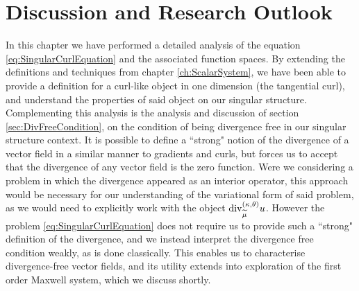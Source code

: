 \section{Discussion and Research Outlook} \label{sec:CC-Discussion}
In this chapter we have performed a detailed analysis of the equation \eqref{eq:SingularCurlEquation} and the associated function spaces.
By extending the definitions and techniques from chapter \ref{ch:ScalarSystem}, we have been able to provide a definition for a curl-like object in one dimension (the tangential curl), and understand the properties of said object on our singular structure.
Complementing this analysis is the analysis and discussion of section \ref{sec:DivFreeCondition}, on the condition of being divergence free in our singular structure context.
It is possible to define a ``strong" notion of the divergence of a vector field in a similar manner to gradients and curls, but forces us to accept that the divergence of any vector field is the zero function.
Were we considering a problem in which the divergence appeared as an interior operator, this approach would be necessary for our understanding of the variational form of said problem, as we would need to explicitly work with the object $\mathrm{div}_{\widetilde{\mu}}^{\left( \kappa, \theta \right)}u$.
However the problem \eqref{eq:SingularCurlEquation} does not require us to provide such a ``strong" definition of the divergence, and we instead interpret the divergence free condition weakly, as is done classically.
This enables us to characterise divergence-free vector fields, and its utility extends into exploration of the first order Maxwell system, which we discuss shortly.


